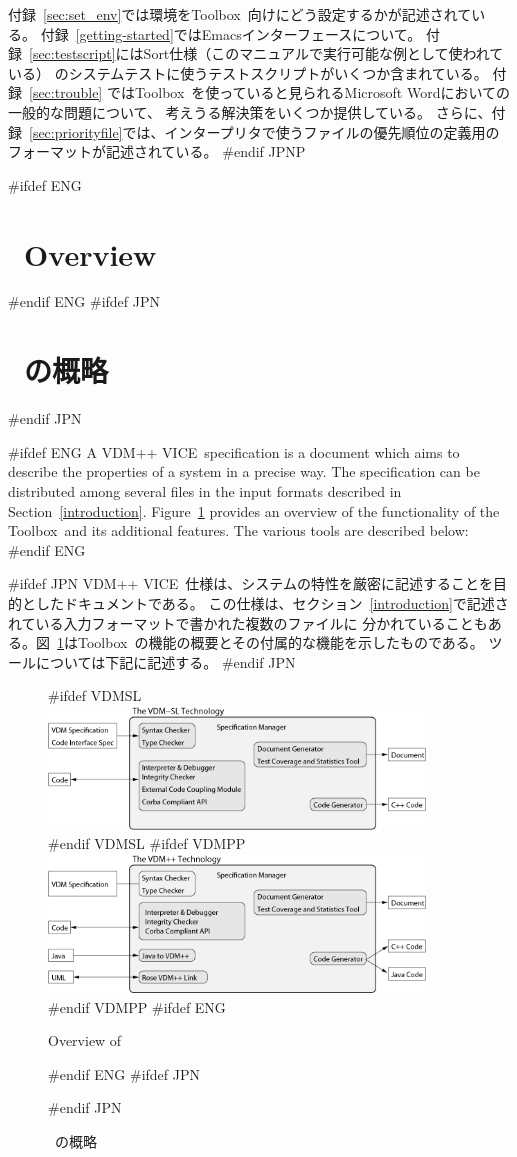 \documentclass[\pformat,12pt]{article}
\newcommand{\vdmslpp}{VDM-SL}
\newcommand{\Toolbox}{Toolbox}
\newcommand{\vdmslpp}{VDM++}
\newcommand{\Toolbox}{Toolbox}
\renewcommand{\vdmslpp}{VDM++ VICE}
\begin{document}
付録~\ref{sec:set_env}では環境を\Toolbox\ 向けにどう設定するかが記述されている。
付録~\ref{getting-started}ではEmacsインターフェースについて。
付録~\ref{sec:testscript}にはSort仕様（このマニュアルで実行可能な例として使われている）
のシステムテストに使うテストスクリプトがいくつか含まれている。
付録~\ref{sec:trouble} では\Toolbox\ を使っていると見られるMicrosoft Wordにおいての一般的な問題について、
考えうる解決策をいくつか提供している。
{さらに、付録~\ref{sec:priorityfile}では、インタープリタで使うファイルの優先順位の定義用の
フォーマットが記述されている。}
#endif JPNP

\newpage

#ifdef ENG
\section{\protect\VDMTools\ Overview}\label{sec:overview}
#endif ENG
#ifdef JPN
\section{\protect\VDMTools\ の概略}\label{sec:overview}
#endif JPN

#ifdef ENG
A \vdmslpp\ specification is a document which aims to describe the
properties of a system in a precise way. The specification can be
distributed among several files in the input formats described in
Section~\ref{introduction}.  Figure~\ref{fig:toolbox} provides an
overview of the functionality of the \Toolbox\ and its additional
features. The various tools are described below:
#endif ENG

#ifdef JPN
\vdmslpp\ 仕様は、システムの特性を厳密に記述することを目的としたドキュメントである。
この仕様は、セクション~\ref{introduction}で記述されている入力フォーマットで書かれた複数のファイルに
分かれていることもある。図~\ref{fig:toolbox}は\Toolbox\ の機能の概要とその付属的な機能を示したものである。
ツールについては下記に記述する。
#endif JPN

\begin{figure}
\begin{center}
#ifdef VDMSL
\includegraphics[width=10cm]{vdmtools_sl.png}
#endif VDMSL
#ifdef VDMPP
\includegraphics[width=10cm]{vdmtools_pp.png}
#endif VDMPP
#ifdef ENG
\caption{Overview of \protect\VDMTools}
#endif ENG
#ifdef JPN
\caption{\protect\VDMTools\ の概略}
#endif JPN
\label{fig:toolbox}
\end{center}
\end{figure}
\end{document}

